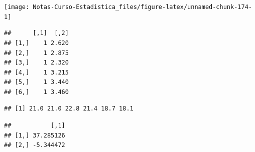 \documentclass[
  12pt,
]{book}
\newenvironment{Shaded}{\begin{snugshade}}{\end{snugshade}}
\newcommand{\DataTypeTok}[1]{\textcolor[rgb]{0.13,0.29,0.53}{#1}}
\newcommand{\DecValTok}[1]{\textcolor[rgb]{0.00,0.00,0.81}{#1}}
\newcommand{\FloatTok}[1]{\textcolor[rgb]{0.00,0.00,0.81}{#1}}
\newcommand{\KeywordTok}[1]{\textcolor[rgb]{0.13,0.29,0.53}{\textbf{#1}}}
\newcommand{\NormalTok}[1]{#1}
\newcommand{\OperatorTok}[1]{\textcolor[rgb]{0.81,0.36,0.00}{\textbf{#1}}}
\newcommand{\StringTok}[1]{\textcolor[rgb]{0.31,0.60,0.02}{#1}}
\theoremstyle{definition}
\theoremstyle{definition}
\theoremstyle{definition}
\theoremstyle{remark}
\begin{document}
\begin{center}\texttt{[image: Notas-Curso-Estadistica\_files/figure-latex/unnamed-chunk-174-1]} \end{center}

\begin{Shaded}
\end{Shaded}

\begin{verbatim}
##      [,1]  [,2]
## [1,]    1 2.620
## [2,]    1 2.875
## [3,]    1 2.320
## [4,]    1 3.215
## [5,]    1 3.440
## [6,]    1 3.460
\end{verbatim}

\begin{Shaded}
\end{Shaded}

\begin{verbatim}
## [1] 21.0 21.0 22.8 21.4 18.7 18.1
\end{verbatim}

\begin{Shaded}
\end{Shaded}

\begin{verbatim}
##           [,1]
## [1,] 37.285126
## [2,] -5.344472
\end{verbatim}

\begin{Shaded}
\end{Shaded}
\end{document}
